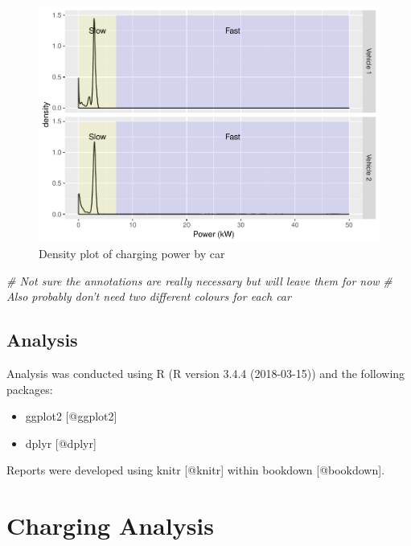 \documentclass[]{article}
\newenvironment{Shaded}{\begin{snugshade}}{\end{snugshade}}
\newcommand{\CommentTok}[1]{\textcolor[rgb]{0.56,0.35,0.01}{\textit{#1}}}
\providecommand{\tightlist}{%
  \setlength{\itemsep}{0pt}\setlength{\parskip}{0pt}}
\begin{document}
\begin{figure}
\centering
\includegraphics{EVBB_Report_files/figure-latex/plot1-1.pdf}
\caption{\label{fig:plot1}Density plot of charging power by car}
\end{figure}

\begin{Shaded}
\begin{Highlighting}[]
\CommentTok{# Not sure the annotations are really necessary but will leave them for now}
\CommentTok{# Also probably don't need two different colours for each car}
\end{Highlighting}
\end{Shaded}

\subsection{Analysis}\label{analysis}

Analysis was conducted using R (R version 3.4.4 (2018-03-15)) and the
following packages:

\begin{itemize}
\tightlist
\item
  ggplot2 {[}@ggplot2{]}
\item
  dplyr {[}@dplyr{]}
\end{itemize}

Reports were developed using knitr {[}@knitr{]} within bookdown
{[}@bookdown{]}.

\section{Charging Analysis}\label{charging-analysis}
\end{document}
